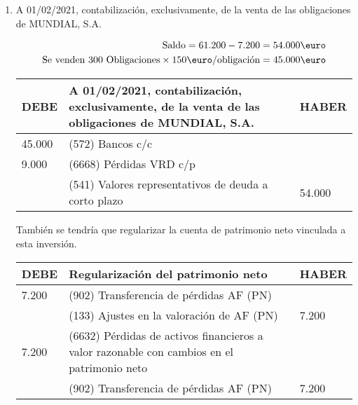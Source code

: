 \begin{enumerate}[label=\alph*)]
    \item A 01/02/2021, contabilización, exclusivamente, de la venta de las obligaciones de MUNDIAL, S.A.
    
    \begin{align*}
        \text{Saldo} = \text{61.200} - \text{7.200} = \text{54.000} \text{\euro} \\
        \text{Se venden} \text{ 300 Obligaciones} \times 150 \text{\euro/obligación} = \text{45.000} \text{\euro}
    \end{align*}

    \begin{table}[H]
        \centering
        \begin{tabular}{|p{3cm}|p{6cm}|p{3cm}|}
        \hline
        \rowcolor{blue!30}
        \textbf{DEBE} & \textbf{A 01/02/2021, contabilización, exclusivamente, de la venta de las obligaciones de MUNDIAL, S.A.} & \textbf{HABER} \\
        \hline
        45.000 & (572) Bancos c/c & \\
        \hline
        9.000 & (6668) Pérdidas VRD c/p & \\
        \hline
        & (541) Valores representativos de deuda a corto plazo & 54.000 \\
        \hline
        \end{tabular}
    \end{table}

    También se tendría que regularizar la cuenta de patrimonio neto vinculada a esta inversión.

    \begin{table}[H]
        \centering
        \begin{tabular}{|p{3cm}|p{6cm}|p{3cm}|}
        \hline
        \rowcolor{blue!30}
        \textbf{DEBE} & \textbf{Regularización del patrimonio neto} & \textbf{HABER} \\
        \hline
        7.200 & (902) Transferencia de pérdidas AF (PN) & \\
        \hline
        & (133) Ajustes en la valoración de AF (PN) & 7.200 \\
        \hline
        7.200 & (6632) Pérdidas de activos financieros a valor razonable con cambios en el patrimonio neto & \\
        \hline
        & (902) Transferencia de pérdidas AF (PN) & 7.200 \\
        \hline
        \end{tabular}
    \end{table}
\end{enumerate}

